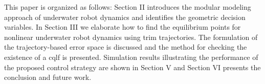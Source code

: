 
This paper is organized as follows: Section II introduces the modular modeling approach of underwater robot dynamics and identifies the geometric decision variables. In Section III we elaborate how to find the equilibrium points for nonlinear underwater robot dynamics using trim trajectories. The formulation of the trajectory-based error space is discussed and the method for checking the existence of a \ac{cqlf} is presented. Simulation results illustrating the performance of the proposed control strategy are shown in Section V and Section VI presents the conclusion and future work.

